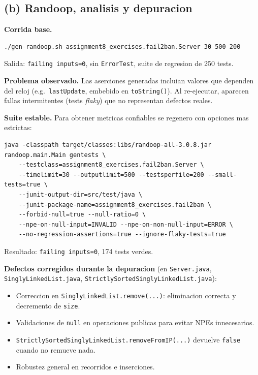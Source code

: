\documentclass[12pt,a4paper]{article}
\begin{document}
\subsection{(b) Randoop, analisis y depuracion}

\textbf{Corrida base.}

\begin{lstlisting}[style=codestyle]
./gen-randoop.sh assignment8_exercises.fail2ban.Server 30 500 200
\end{lstlisting}

Salida: \texttt{failing inputs=0}, sin \texttt{ErrorTest}, suite de regresion de 250 tests.

\textbf{Problema observado.} Las aserciones generadas incluian valores que dependen del
reloj (e.g.\ \texttt{lastUpdate}, embebido en \texttt{toString()}). Al re-ejecutar, aparecen
fallas intermitentes (tests \emph{flaky}) que no representan defectos reales.

\textbf{Suite estable.} Para obtener metricas confiables se regenero con opciones mas
estrictas:

\begin{lstlisting}[style=codestyle]
java -classpath target/classes:libs/randoop-all-3.0.8.jar randoop.main.Main gentests \
    --testclass=assignment8_exercises.fail2ban.Server \
    --timelimit=30 --outputlimit=500 --testsperfile=200 --small-tests=true \
    --junit-output-dir=src/test/java \
    --junit-package-name=assignment8_exercises.fail2ban \
    --forbid-null=true --null-ratio=0 \
    --npe-on-null-input=INVALID --npe-on-non-null-input=ERROR \
    --no-regression-assertions=true --ignore-flaky-tests=true
\end{lstlisting}

Resultado: \texttt{failing inputs=0}, 174 tests verdes.

\textbf{Defectos corregidos durante la depuracion} (en \texttt{Server.java},
\texttt{SinglyLinkedList.java}, \texttt{StrictlySortedSinglyLinkedList.java}):

\begin{itemize}
  \item Correccion en \texttt{SinglyLinkedList.remove(...)}: eliminacion correcta y
  decremento de \texttt{size}.
  \item Validaciones de \texttt{null} en operaciones publicas para evitar NPEs innecesarios.
  \item \texttt{StrictlySortedSinglyLinkedList.removeFromIP(...)} devuelve \texttt{false}
  cuando no remueve nada.
  \item Robustez general en recorridos e inserciones.
\end{itemize}
\end{document}
